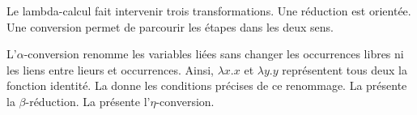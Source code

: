 \documentclass[../../../include/open-logic-section]{subfiles}
\begin{document}

Le lambda-calcul fait intervenir trois transformations.
Une réduction est orientée. Une conversion permet de parcourir
les étapes dans les deux sens.

L'$\alpha$-conversion renomme les variables liées sans changer
les occurrences libres ni les liens entre lieurs et occurrences.
Ainsi, $\lambda x.x$ et $\lambda y.y$ représentent tous deux
la fonction identité. La  donne
les conditions précises de ce renommage. La
 présente la $\beta$-réduction.
La  présente l'$\eta$-conversion.
\end{document}
